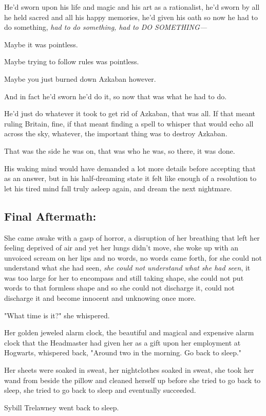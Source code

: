 He'd sworn upon his life and magic and his art as a rationalist, he'd sworn by 
all he held sacred and all his happy memories, he'd given his oath so now he 
had to do something,\emph{ had to do something, had to DO SOMETHING---}

Maybe it was pointless.

Maybe trying to follow rules was pointless.

Maybe you just burned down Azkaban however.

And in fact he'd sworn he'd do it, so now that was what he had to do.

He'd just do whatever it took to get rid of Azkaban, that was all. If that 
meant ruling Britain, fine, if that meant finding a spell to whisper that would 
echo all across the sky, whatever, the important thing was to destroy Azkaban.

That was the side he was on, that was who he was, so there, it was done.

His waking mind would have demanded a lot more details before accepting that as 
an answer, but in his half-dreaming state it felt like enough of a resolution 
to let his tired mind fall truly asleep again, and dream the next nightmare.
\sbreak
\subsection{Final Aftermath:}

She came awake with a gasp of horror, a disruption of her breathing that left 
her feeling deprived of air and yet her lungs didn't move, she woke up with an 
unvoiced scream on her lips and no words, no words came forth, for she could 
not understand what she had seen, \emph{she could not understand what she had 
seen}, it was too large for her to encompass and still taking shape, she could 
not put words to that formless shape and so she could not discharge it, could 
not discharge it and become innocent and unknowing once more.

"What time is it?" she whispered.

Her golden jeweled alarm clock, the beautiful and magical and expensive alarm 
clock that the Headmaster had given her as a gift upon her employment at 
Hogwarts, whispered back, "Around two in the morning. Go back to sleep."

Her sheets were soaked in sweat, her nightclothes soaked in sweat, she took her 
wand from beside the pillow and cleaned herself up before she tried to go back 
to sleep, she tried to go back to sleep and eventually succeeded.

Sybill Trelawney went back to sleep.
